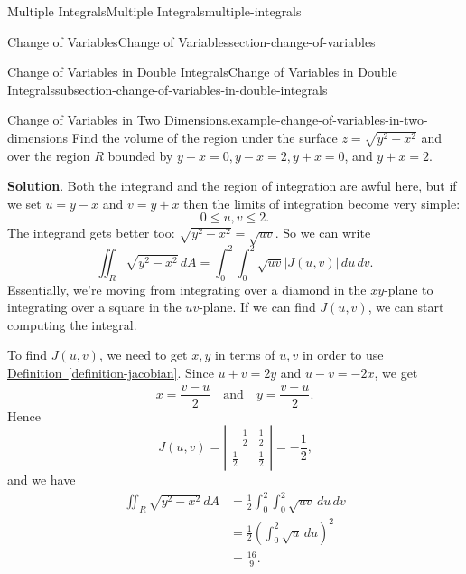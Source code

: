 \documentclass[oneside,10pt,]{book}
\numberwithin{equation}{section}
\newcommand{\qq}[1]{\quad\text{#1}\quad}
\newcommand{\amp}{&}
\begin{document}
\begin{chapterptx}{Multiple Integrals}{}{Multiple Integrals}{}{}{multiple-integrals}
\begin{sectionptx}{Change of Variables}{}{Change of Variables}{}{}{section-change-of-variables}
\begin{subsectionptx}{Change of Variables in Double Integrals}{}{Change of Variables in Double Integrals}{}{}{subsection-change-of-variables-in-double-integrals}
\begin{example}{Change of Variables in Two Dimensions.}{example-change-of-variables-in-two-dimensions}%
\hypertarget{p-1552}{}%
Find the volume of the region under the surface \(z = \sqrt{y^{2} - x^{2}}\) and over the region \(R\) bounded by \(y - x = 0, y - x = 2, y + x = 0\), and \(y + x = 2\).%
\par\smallskip%
\noindent\textbf{Solution}.\hypertarget{solution-259}{}\quad%
\hypertarget{p-1553}{}%
Both the integrand and the region of integration are awful here, but if we set \(u = y - x\) and \(v = y + x\) then the limits of integration become very simple:%
\begin{equation*}
0 \leq u,v \leq 2\text{.}
\end{equation*}
The integrand gets better too: \(\sqrt{y^{2} - x^{2}} = \sqrt{uv}\). So we can write%
\begin{equation*}
\iint_{R}\sqrt{y^{2} - x^{2}}\,dA = \int_{0}^{2}\int_{0}^{2}\sqrt{uv}|J(u,v)|\,du\,dv\text{.}
\end{equation*}
Essentially, we're moving from integrating over a diamond in the \(xy\)-plane to integrating over a square in the \(uv\)-plane. If we can find \(J(u,v)\), we can start computing the integral.%
\par
\hypertarget{p-1554}{}%
To find \(J(u,v)\), we need to get \(x,y\) in terms of \(u,v\) in order to use \hyperref[definition-jacobian]{Definition~\ref{definition-jacobian}}. Since \(u + v = 2y\) and \(u - v = -2x\), we get%
\begin{equation*}
x = \frac{v - u}{2} \qq{and} y = \frac{v + u}{2}\text{.}
\end{equation*}
Hence%
\begin{equation*}
J(u,v) = \left|\begin{array}{cc}-\frac{1}{2} \amp \frac{1}{2} \\ \frac{1}{2} \amp \frac{1}{2}\end{array}\right| = -\frac{1}{2}\text{,}
\end{equation*}
and we have%
\begin{align*}
\iint_{R}\sqrt{y^{2} - x^{2}}\,dA \amp = \frac{1}{2}\int_{0}^{2}\int_{0}^{2}\sqrt{uv}\,du\,dv \\
\amp = \frac{1}{2}\left(\int_{0}^{2}\sqrt{u}\,du\right)^{2} \\
\amp = \frac{16}{9} \text{.}
\end{align*}
%
\end{example}
\end{subsectionptx}
\end{sectionptx}
\end{chapterptx}
\end{document}
